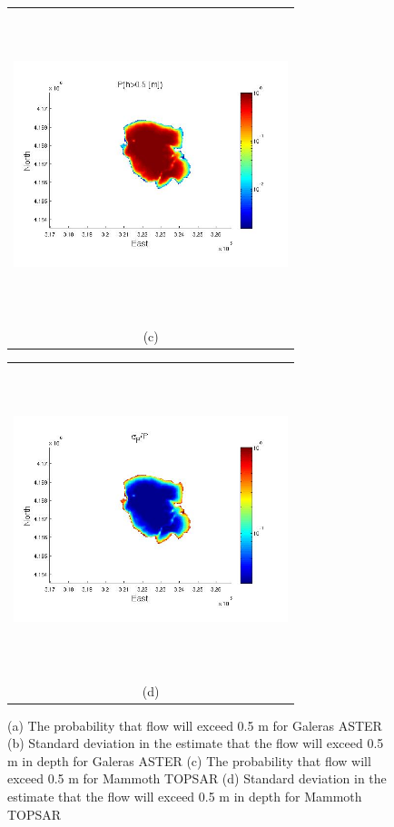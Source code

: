 \documentclass[12pt]{article}
\newcommand{\Pic}[2][0.85]{\begin{center}\texttt{[image: \#2]}
 \end{center} }
\begin{document}
\begin{figure}[H]
\begin{minipage}{0.6\textwidth}
\begin{tabular}{c}
        \end{tabular}
    \end{minipage} 
     \begin{minipage}[b]{0.6\textwidth}
        \begin{tabular}{c}
       \includegraphics[width=8cm,height=9cm,keepaspectratio]{figs/Mammoth_Topsar30_P.jpg}\\
        (c)
        \end{tabular}
    \end{minipage}
    \begin{minipage}{0.6\textwidth}
        \begin{tabular}{c}
	\includegraphics[width=8cm,height=9cm,keepaspectratio]{figs/Mammoth_Topsar30_sigma.jpg}\\
        (d)
        \end{tabular}
    \end{minipage} 
\caption{ (a) The probability that flow will exceed 0.5 m for Galeras ASTER (b) Standard deviation in the estimate that the flow will
 exceed 0.5 m in depth for Galeras ASTER
  (c) The probability that flow will exceed 0.5 m for Mammoth TOPSAR (d) Standard deviation in the estimate that the flow will
 exceed 0.5 m in depth for Mammoth TOPSAR}
\label{fig7}  
\end{figure}
\end{document}
